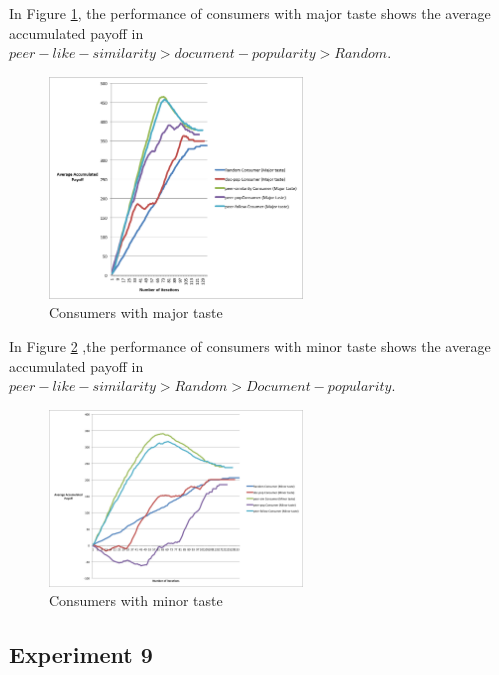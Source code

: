 \documentclass [12pt]{article} \usepackage{multicol}
\begin{document}
In Figure \ref{fig:images/F13}, the performance of consumers with major taste shows the average accumulated payoff in $ peer-like-similarity > document-popularity > Random $.  


\begin{figure}[h!]
\begin{center}
\includegraphics[width=0.6\textwidth,center]{images/EXP8-Strategies-cons-Major-taste.png}
\caption{Consumers with major taste}
\label{fig:images/F13}
\end{center}
\end{figure}


In Figure \ref{fig:images/F14} ,the performance of consumers with minor taste shows the average accumulated payoff in $ peer-like-similarity > Random > Document-popularity $.  


\begin{figure}[h!]
\begin{center}
\includegraphics[width=0.6\textwidth,center]{images/EXP8-Strategies-cons-Minor-taste}
\caption{Consumers with minor taste}
\label{fig:images/F14}
\end{center}
\end{figure}


\subsection{Experiment 9}
\end{document}
